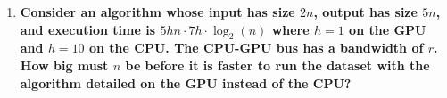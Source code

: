 \begin{enumerate}
%
%
%
%
%
%
%





\item \textbf{Consider an algorithm whose input has size $2n$, output has size $5n$, and execution time is $5hn \cdot 7h \cdot \log_2(n)$ where $h = 1$ on the GPU and $h = 10$ on the CPU. The CPU-GPU bus has a bandwidth of $r$. How big must $n$ be before it is faster to run the dataset with the algorithm detailed on the GPU instead of the CPU?}


\end{enumerate}
